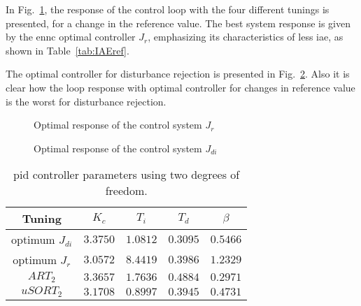 In Fig.~\ref{fig:cambioreferencia}, the response of the control loop with the four different tunings is presented, for a change in the reference value. The best system response is given by the \gls{ennc} optimal controller $J_r$, emphasizing its characteristics of less \gls{iae}, as shown in Table~\ref{tab:IAEref}.

The optimal controller for disturbance rejection is presented in Fig.~\ref{fig:cambiodi}. Also it is clear how the loop response with optimal controller for changes in reference value is the worst for disturbance rejection.%
%
%
\begin{figure}%
	\centering
	\caption{Optimal response of the control system $J_r$}%
	\label{fig:cambioreferencia}%
\end{figure}
%
\begin{figure}%
	\centering
	\caption{Optimal response of the control system $J_{di}$}%
	\label{fig:cambiodi}%
\end{figure}
%
\begin{table}
	\caption{\gls{pid} controller parameters using two degrees of freedom.}
	\centering
	\begin{tabular}{@{}*{5}{c}@{}}
		\toprule
		Tuning              &$K_c$       &$T_i$      &$T_d$     & $\beta$ 	\\
		\midrule              
		optimum $J_{di}$     &$3.3750$   & $1.0812$  &$0.3095$  &$0.5466$   \\
		optimum $J_{r}$      &$3.0572$   & $8.4419$  &$0.3986$  &$1.2329$   \\
		$ART_2$             &$3.3657$   & $1.7636$  &$0.4884$  &$0.2971$   \\
		$uSORT_2$           &$3.1708$   & $0.8997$  &$0.3945$  &$0.4731$   \\	
		\bottomrule				
	\end{tabular}
	\label{tab:parametroscontrolador}
\end{table}

